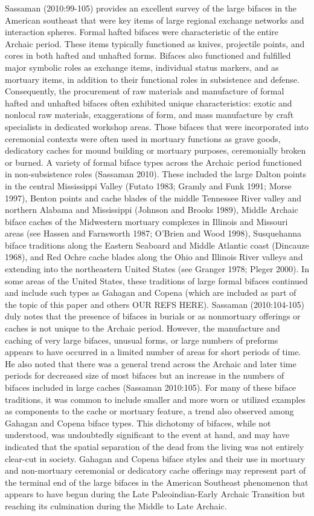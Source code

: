 \documentclass[]{interact}
\theoremstyle{plain}%
\theoremstyle{definition}
\theoremstyle{remark}
\begin{document}
Sassaman (2010:99-105) provides an excellent survey of the large bifaces
in the American southeast that were key items of large regional exchange
networks and interaction spheres. Formal hafted bifaces were
characteristic of the entire Archaic period. These items typically
functioned as knives, projectile points, and cores in both hafted and
unhafted forms. Bifaces also functioned and fulfilled major symbolic
roles as exchange items, individual status markers, and as mortuary
items, in addition to their functional roles in subsistence and defense.
Consequently, the procurement of raw materials and manufacture of formal
hafted and unhafted bifaces often exhibited unique characteristics:
exotic and nonlocal raw materials, exaggerations of form, and mass
manufacture by craft specialists in dedicated workshop areas. Those
bifaces that were incorporated into ceremonial contexts were often used
in mortuary functions as grave goods, dedicatory caches for mound
building or mortuary purposes, ceremonially broken or burned. A variety
of formal biface types across the Archaic period functioned in
non-subsistence roles (Sassaman 2010). These included the large Dalton
points in the central Mississippi Valley (Futato 1983; Gramly and Funk
1991; Morse 1997), Benton points and cache blades of the middle
Tennessee River valley and northern Alabama and Mississippi (Johnson and
Brooks 1989), Middle Archaic biface caches of the Midwestern mortuary
complexes in Illinois and Missouri areas (see Hassen and Farnsworth
1987; O'Brien and Wood 1998), Susquehanna biface traditions along the
Eastern Seaboard and Middle Atlantic coast (Dincauze 1968), and Red
Ochre cache blades along the Ohio and Illinois River valleys and
extending into the northeastern United States (see Granger 1978; Pleger
2000). In some areas of the United States, these traditions of large
formal bifaces continued and include such types as Gahagan and Copena
(which are included as part of the topic of this paper and others OUR
REFS HERE). Sassaman (2010:104-105) duly notes that the presence of
bifaces in burials or as nonmortuary offerings or caches is not unique
to the Archaic period. However, the manufacture and caching of very
large bifaces, unusual forms, or large numbers of preforms appears to
have occurred in a limited number of areas for short periods of time. He
also noted that there was a general trend across the Archaic and later
time periods for decreased size of most bifaces but an increase in the
numbers of bifaces included in large caches (Sassaman 2010:105). For
many of these biface traditions, it was common to include smaller and
more worn or utilized examples as components to the cache or mortuary
feature, a trend also observed among Gahagan and Copena biface types.
This dichotomy of bifaces, while not understood, was undoubtedly
significant to the event at hand, and may have indicated that the
spatial separation of the dead from the living was not entirely
clear-cut in society. Gahagan and Copena biface styles and their use in
mortuary and non-mortuary ceremonial or dedicatory cache offerings may
represent part of the terminal end of the large bifaces in the American
Southeast phenomenon that appears to have begun during the Late
Paleoindian-Early Archaic Transition but reaching its culmination during
the Middle to Late Archaic.
\end{document}
